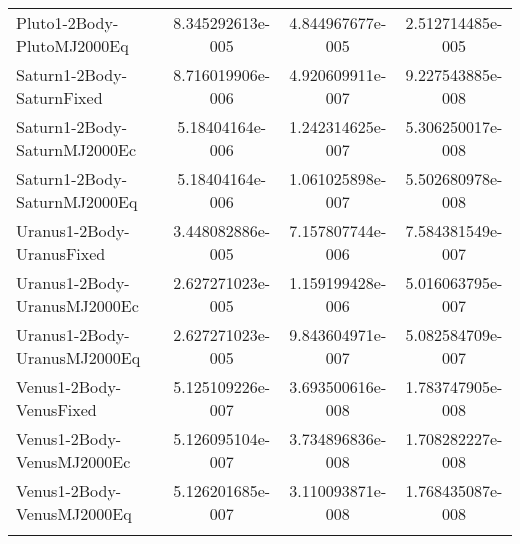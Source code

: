 \begin{table}[htbp!]
\begin{tabular}{lccc}
         Pluto1-2Body-PlutoMJ2000Eq & 8.345292613e-005 & 4.844967677e-005 & 2.512714485e-005 \\
         Saturn1-2Body-SaturnFixed & 8.716019906e-006 & 4.920609911e-007 & 9.227543885e-008 \\
         Saturn1-2Body-SaturnMJ2000Ec & 5.18404164e-006 & 1.242314625e-007 & 5.306250017e-008 \\
         Saturn1-2Body-SaturnMJ2000Eq & 5.18404164e-006 & 1.061025898e-007 & 5.502680978e-008 \\
         Uranus1-2Body-UranusFixed & 3.448082886e-005 & 7.157807744e-006 & 7.584381549e-007 \\
         Uranus1-2Body-UranusMJ2000Ec & 2.627271023e-005 & 1.159199428e-006 & 5.016063795e-007 \\
         Uranus1-2Body-UranusMJ2000Eq & 2.627271023e-005 & 9.843604971e-007 & 5.082584709e-007 \\
         Venus1-2Body-VenusFixed & 5.125109226e-007 & 3.693500616e-008 & 1.783747905e-008 \\
         Venus1-2Body-VenusMJ2000Ec & 5.126095104e-007 & 3.734896836e-008 & 1.708282227e-008 \\
         Venus1-2Body-VenusMJ2000Eq & 5.126201685e-007 & 3.110093871e-008 & 1.768435087e-008 \\
      \hline\hline
      \label{Table: WinGMAT-STK CS Parameters Set 4} 
\end{tabular}
\end{table}
